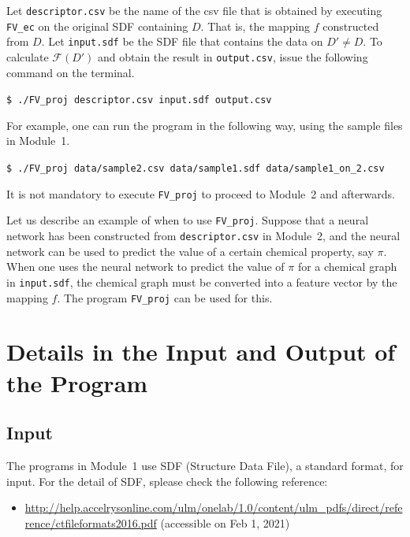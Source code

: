 \documentclass[11pt,titlepage,dvipdfmx,twoside]{book}
\begin{document}
Let {\tt descriptor.csv}
be the name of the csv file that is obtained by
executing {\tt FV\_ec} on the original SDF containing $D$.
That is, the mapping $f$ constructed from $D$.
Let {\tt input.sdf} be the SDF file
that contains the data on $D'\ne D$.
To calculate ${\mathcal F}(D')$ and
obtain the result in {\tt output.csv},
issue the following command on the terminal. 
\begin{oframed}
{\small
\verb|$ ./FV_proj descriptor.csv input.sdf output.csv|
}
\end{oframed}

For example, one can run the program in the following way,
using the sample files in Module~1.  
\begin{oframed}
{\small
\verb|$ ./FV_proj data/sample2.csv data/sample1.sdf data/sample1_on_2.csv|
}
\end{oframed}

It is not mandatory to execute {\tt FV\_proj} to proceed to Module~2 and afterwards.

Let us describe an example of when to use {\tt FV\_proj}.
Suppose that a neural network has been constructed from
{\tt descriptor.csv} in Module~2,
and the neural network can be used to predict
the value of a certain chemical property, say $\pi$.
When one uses the neural network to predict
the value of $\pi$ for a chemical graph in {\tt input.sdf},
the chemical graph must be converted into
a feature vector by the mapping $f$.
The program {\tt FV\_proj} can be used for this. 


\clearpage
\section{Details in the Input and Output of the Program}
\label{sec:io}


\subsection{Input}

The programs in Module~1
use SDF (Structure Data File),
a standard format, for input.
For the detail of SDF, splease check the following reference: 
\begin{itemize}
\item \url{http://help.accelrysonline.com/ulm/onelab/1.0/content/ulm_pdfs/direct/reference/ctfileformats2016.pdf} (accessible on Feb 1, 2021)
\end{itemize}
\end{document}
